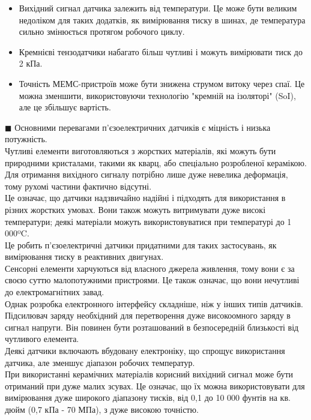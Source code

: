 \documentclass[a4paper,fontsize=12]{report}
\begin{document}
{\begin{itemize}
  \item Вихідний сигнал датчика залежить від температури. Це може бути великим недоліком для таких додатків, як вимірювання тиску в шинах, де температура сильно змінюється протягом робочого циклу.

  \item Кремнієві тензодатчики набагато більш чутливі і можуть вимірювати тиск до 2 кПа.

  \item Точність МЕМС-пристроїв може бути знижена струмом витоку через спаї. Це можна зменшити, використовуючи технологію "кремній на ізоляторі" (SoI), але це збільшує вартість.
  \end{itemize}}
\clearpage
$\blacksquare$ Основними перевагами п'єзоелектричних датчиків є міцність і низька потужність.\\

  Чутливі елементи виготовляються з жорстких матеріалів, які можуть бути природними кристалами, такими як кварц, або спеціально розробленої керамікою. Для отримання вихідного сигналу потрібно лише дуже невелика деформація, тому рухомі частини фактично відсутні.\\

  Це означає, що датчики надзвичайно надійні і підходять для використання в різних жорстких умовах. Вони також можуть витримувати дуже високі температури; деякі матеріали можуть використовуватися при температурі до 1 000ºC.\\

  Це робить п'єзоелектричні датчики придатними для таких застосувань, як вимірювання тиску в реактивних двигунах.\\

  Сенсорні елементи харчуються від власного джерела живлення, тому вони є за своєю суттю малопотужними пристроями. Це також означає, що вони нечутливі до електромагнітних завад.\\

  Однак розробка електронного інтерфейсу складніше, ніж у інших типів датчиків. Підсилювач заряду необхідний для перетворення дуже високоомного заряду в сигнал напруги. Він повинен бути розташований в безпосередній близькості від чутливого елемента.\\

  Деякі датчики включають вбудовану електроніку, що спрощує використання датчика, але зменшує діапазон робочих температур.\\

  При використанні керамічних матеріалів корисний вихідний сигнал може бути отриманий при дуже малих зсувах. Це означає, що їх можна використовувати для вимірювання дуже широкого діапазону тисків, від 0,1 до 10 000 фунтів на кв. дюйм (0,7 кПа - 70 МПа), з дуже високою точністю.\\
\end{document}
